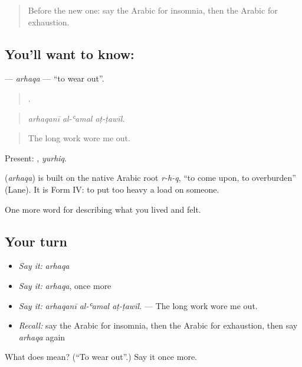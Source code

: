 \begin{quote}
Before the new one: say the Arabic for insomnia, then the Arabic for exhaustion.
\end{quote}

\subsection*{You'll want to know: }
\textbf{} — \emph{arhaqa} — \textquotedblleft{}to wear out\textquotedblright{}.

\begin{quote}
  .
\end{quote}

\begin{quote}
\emph{arhaqanī al-ʿamal aṭ-ṭawīl.}
\end{quote}

\begin{quote}
The long work wore me out.
\end{quote}

Present: , \emph{yurhiq}.

\begin{cousinweb}
\textbf{} (\emph{arhaqa}) is built on the native Arabic root \emph{r-h-q}, \textquotedblleft{}to come upon, to overburden\textquotedblright{} (Lane). It is Form IV: to put too heavy a load on someone.
\end{cousinweb}

\begin{grammarlens}[title={What you've built}]
One more word for describing what you lived and felt.
\end{grammarlens}

\subsection*{Your turn}
\begin{itemize}
\raggedright
  \item \emph{Say it:} \emph{arhaqa}
  \item \emph{Say it:} \emph{arhaqa}, once more
  \item \emph{Say it:} \emph{arhaqanī al-ʿamal aṭ-ṭawīl.} — The long work wore me out.
  \item \emph{Recall:} say the Arabic for insomnia, then the Arabic for exhaustion, then say \emph{arhaqa} again
\end{itemize}

\begin{tcolorbox}[breakable,colback=teal!4,colframe=teal!35!black,title={Before you move on}]
What does  mean? (\textquotedblleft{}To wear out\textquotedblright{}.) Say it once more.
\end{tcolorbox}
